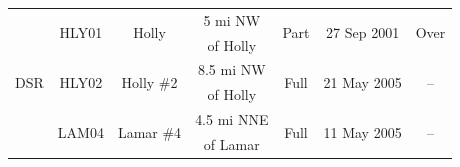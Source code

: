 \begin{table}[htb]
\begin{tabular}{ccccccc}
    	\multirow{6}[0]{*}{DSR}  & \multirow{2}[0]{*}{HLY01} &   \multirow{2}[0]{*}{Holly}    &    5 mi NW     &  \multirow{2}[0]{*}{Part}   & \multirow{2}[0]{*}{27 Sep 2001} & \multirow{2}[0]{*}{Over}  \\
    	                         &                           &                                &    of Holly    &                             &                                 &  \\
    	     \cmidrule{2-7}      & \multirow{2}[0]{*}{HLY02} & \multirow{2}[0]{*}{Holly \#2}  &   8.5 mi NW    &  \multirow{2}[0]{*}{Full}   & \multirow{2}[0]{*}{21 May 2005} &  \multirow{2}[0]{*}{--}   \\
    	                         &                           &                                &    of Holly    &                             &                                 &  \\
    	    \cmidrule{2-7}
    	    \cmidrule{2-7}
    	     \cmidrule{2-7}      & \multirow{2}[0]{*}{LAM04} & \multirow{2}[0]{*}{Lamar \#4}  &   4.5 mi NNE   &  \multirow{2}[0]{*}{Full}   & \multirow{2}[0]{*}{11 May 2005} &  \multirow{2}[0]{*}{--}   \\
    	                         &                           &                                &    of Lamar    &                             &                                 &  \\
    \end{tabular}
\end{table}

